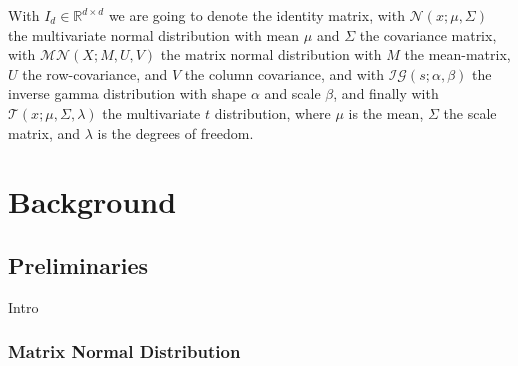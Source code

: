 \documentclass{mldsmsc}
\begin{document}
\noindent With $I_d \in \mathbb{R}^{d \times d}$ we are going to denote the identity matrix, with $\mathcal{N}(x; \mu, \Sigma)$ the multivariate normal distribution with mean $\mu$ and $\Sigma$ the covariance matrix, with $\mathcal{MN}(X; M, U, V)$ the matrix normal distribution with $M$ the mean-matrix, $U$ the row-covariance, and $V$ the column covariance, and with  $\mathcal{IG}(s; \alpha, \beta)$ the inverse gamma distribution with shape $\alpha$ and scale $\beta$, and finally with $\mathcal{T}(x; \mu, \Sigma, \lambda)$ the multivariate $t$ distribution, where $\mu$ is the mean, $\Sigma$ the scale matrix, and $\lambda$ is the degrees of freedom. \newline




\chapter{Background}

\section{Preliminaries}

Intro

\subsection{Matrix Normal Distribution} 
\end{document}
